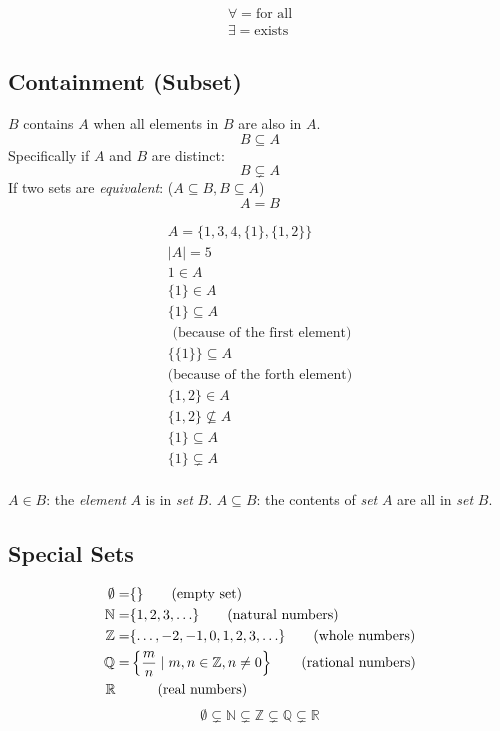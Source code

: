 \documentclass[00_complete]{subfiles}
\begin{document}
\begin{symbols}[Quantifiers]
\begin{gather*}
    \forall = \text{for all} \\
    \exists = \text{exists}
\end{gather*}

\end{symbols}

\subsection{Containment (Subset)}
\begin{definition}[Containment]
$B$ contains $A$ when all elements in $B$ are also in $A$.
$$B \subseteq A$$
Specifically if $A$ and $B$ are distinct:
$$B \subsetneq A$$
If two sets are \emph{equivalent}: ($A \subseteq B, B \subseteq A$)
$$A=B$$
\end{definition}

\begin{example}
\begin{gather*}
    A = \{1,3,4, \{1\}, \{1,2\}\} \\
    |A| = 5 \\
    1 \in A \\
    \{1\} \in A \\
    \{1\} \subseteq A \\
    \text{ (because of the first element)} \\
    \{\{1\}\} \subseteq A \\
    \text{(because of the forth element)} \\
    \{1,2\} \in A \\
    \{1,2\} \nsubseteq A \\
    \{1\} \subseteq A \\
    \{1\} \subsetneq A \\
\end{gather*}
\end{example}

\begin{note}
$A \in B$: the \emph{element} $A$ is in \emph{set} $B$.
$A \subseteq B$: the contents of \emph{set} $A$ are all in \emph{set} $B$.
\end{note}

\subsection{Special Sets}

\begin{align}
    \emptyset  =& \{\} \tag{\text{empty set}} \\
    \mathbb{N} =& \{1,2,3,\mathellipsis\} \tag{\text{natural numbers}} \\
    \mathbb{Z} =& \{\mathellipsis,-2,-1,0,1,2,3,\mathellipsis\}
    \tag{\text{whole numbers}} \\
    \mathbb{Q} =& \left\{ \frac{m}{n} \;|\; m,n \in \mathbb{Z}, n \neq 0
    \right\}\tag{\text{rational numbers}} \\
        \mathbb{R} \quad& \tag{\text{real numbers}}
\end{align}
$$
    \emptyset \subsetneq
    \mathbb{N} \subsetneq
    \mathbb{Z} \subsetneq
    \mathbb{Q} \subsetneq
    \mathbb{R}
$$
\end{document}
